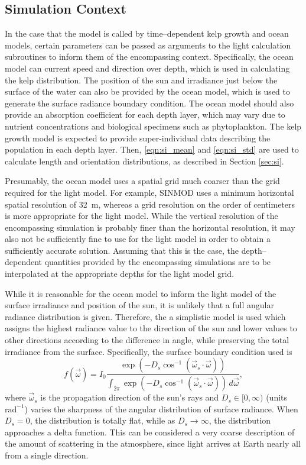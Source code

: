 \subsection{Simulation Context}
In the case that the model is called by time--dependent kelp growth and ocean models, certain parameters can be passed as arguments to the light calculation subroutines to inform them of the encompassing context.
Specifically, the ocean model can current speed and direction over depth, which is used in calculating the kelp distribution.
The position of the sun and irradiance just below the surface of the water can also be provided by the ocean model, which is used to generate the surface radiance boundary condition.
The ocean model should also provide an absorption coefficient for each depth layer, which may vary due to nutrient concentrations and biological specimens such as phytoplankton.
The kelp growth model is expected to provide super-individual data describing the population in each depth layer.
Then, \eqref{eqn:si_mean} and \eqref{eqn:si_std} are used to calculate length and orientation distributions, as described in Section \ref{sec:si}.

Presumably, the ocean model uses a spatial grid much coarser than the grid required for the light model.
For example, SINMOD \cite{wassmann_modelling_2006} uses a minimum horizontal spatial resolution of \SI{32}{\m}, whereas a grid resolution on the order of centimeters is more appropriate for the light model.
While the vertical resolution of the encompassing simulation is probably finer than the horizontal resolution, it may also not be sufficiently fine to use for the light model in order to obtain a sufficiently accurate solution.
Assuming that this is the case, the depth--dependent quantities provided by the encompassing simulations are to be interpolated at the appropriate depths for the light model grid.

While it is reasonable for the ocean model to inform the light model of the surface irradiance and position of the sun, it is unlikely that a full angular radiance distribution is given.
Therefore, the a simplistic model is used which assigns the highest radiance value to the direction of the sun and lower values to other directions according to the difference in angle, while preserving the total irradiance from the surface.
Specifically, the surface boundary condition used is
\begin{equation}
  f(\vec{\omega}) = I_0\frac{\exp\left( -D_s \cos^{-1}\left(\vec{\omega}_s \cdot \vec{\omega}\right) \right)}{\int_{2\pi}\exp\left( -D_s \cos^{-1}\left(\vec{\omega}_s \cdot \vec{\omega}\right) \right)\, d\vec{\omega}},
\end{equation} %
where $\vec{\omega}_s$ is the propagation direction of the sun's rays and $D_s\in[0, \infty)$ (units $\mbox{rad}^{-1}$) varies the sharpness of the angular distribution of surface radiance.
When $D_s=0$, the distribution is totally flat, while as $D_s \to \infty$, the distribution approaches a delta function.
This can be considered a very coarse description of the amount of scattering in the atmosphere, since light arrives at Earth nearly all from a single direction.

